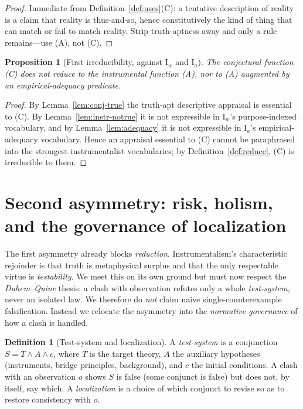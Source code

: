 \documentclass{amsart}
\theoremstyle{definition}
\newtheorem{definition}{Definition}
\theoremstyle{plain}
\newtheorem{proposition}{Proposition}
\begin{document}
\begin{proof}
Immediate from Definition~\ref{def:uses}(C): a tentative description of reality
is a claim that reality is thus-and-so, hence constitutively the kind of thing
that can match or fail to match reality. Strip truth-aptness away and only a
rule remains---use (A), not (C).
\end{proof}

\begin{proposition}[First irreducibility, against $\mathrm I_w$ and $\mathrm
I_a$]\label{prop:irred1}
The conjectural function \textup{(C)} does not reduce to the instrumental
function \textup{(A)}, nor to (A) augmented by an empirical-adequacy predicate.
\end{proposition}

\begin{proof}
By Lemma~\ref{lem:conj-true} the truth-apt descriptive appraisal is essential
to (C). By Lemma~\ref{lem:instr-notrue} it is not expressible in $\mathrm
I_w$'s purpose-indexed vocabulary, and by Lemma~\ref{lem:adequacy} it is not
expressible in $\mathrm I_a$'s empirical-adequacy vocabulary. Hence an appraisal
essential to (C) cannot be paraphrased into the strongest instrumentalist
vocabularies; by Definition~\ref{def:reduce}, (C) is irreducible to them.
\end{proof}

\section{Second asymmetry: risk, holism, and the governance of localization}

The first asymmetry already blocks \emph{reduction}. Instrumentalism's
characteristic rejoinder is that truth is metaphysical surplus and that the
only respectable virtue is \emph{testability}. We meet this on its own ground
but must now respect the \emph{Duhem--Quine} thesis: a clash with observation
refutes only a whole \emph{test-system}, never an isolated law. We therefore do
\emph{not} claim naive single-counterexample falsification. Instead we relocate
the asymmetry into the \emph{normative governance} of how a clash is handled.

\begin{definition}[Test-system and localization]\label{def:testsystem}
A \emph{test-system} is a conjunction $S = T\wedge A\wedge c$, where $T$ is the
target theory, $A$ the auxiliary hypotheses (instruments, bridge principles,
background), and $c$ the initial conditions. A clash with an observation $o$
shows $S$ is false (some conjunct is false) but does not, by itself, say which.
A \emph{localization} is a choice of which conjunct to revise so as to restore
consistency with $o$.
\end{definition}
\end{document}
